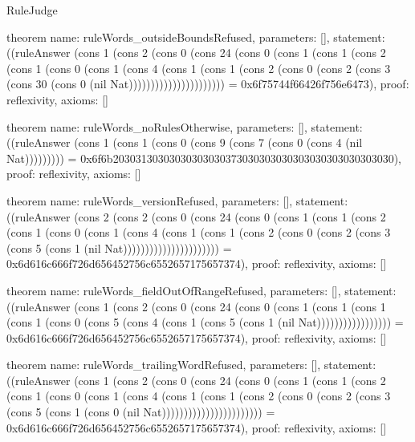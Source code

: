 \begin{lexlean}{RuleJudge}
\begin{semanticmodule}
theorem{
  name: ruleWords_outsideBoundsRefused,
  parameters: [],
  statement: ((ruleAnswer (cons 1 (cons 2 (cons 0 (cons 24 (cons 0 (cons 1 (cons 1 (cons 2 (cons 1 (cons 0 (cons 1 (cons 4 (cons 1 (cons 1 (cons 2 (cons 0 (cons 2 (cons 3 (cons 30 (cons 0 (nil Nat)))))))))))))))))))))) = 0x6f75744f66426f756e6473),
  proof: reflexivity{},
  axioms: []
}

theorem{
  name: ruleWords_noRulesOtherwise,
  parameters: [],
  statement: ((ruleAnswer (cons 1 (cons 1 (cons 0 (cons 9 (cons 7 (cons 0 (cons 4 (nil Nat))))))))) = 0x6f6b20303130303030303030373030303030303030303030303030),
  proof: reflexivity{},
  axioms: []
}

theorem{
  name: ruleWords_versionRefused,
  parameters: [],
  statement: ((ruleAnswer (cons 2 (cons 2 (cons 0 (cons 24 (cons 0 (cons 1 (cons 1 (cons 2 (cons 1 (cons 0 (cons 1 (cons 4 (cons 1 (cons 1 (cons 2 (cons 0 (cons 2 (cons 3 (cons 5 (cons 1 (nil Nat)))))))))))))))))))))) = 0x6d616c666f726d656452756c6552657175657374),
  proof: reflexivity{},
  axioms: []
}

theorem{
  name: ruleWords_fieldOutOfRangeRefused,
  parameters: [],
  statement: ((ruleAnswer (cons 1 (cons 2 (cons 0 (cons 24 (cons 0 (cons 1 (cons 1 (cons 1 (cons 1 (cons 0 (cons 5 (cons 4 (cons 1 (cons 5 (cons 1 (nil Nat))))))))))))))))) = 0x6d616c666f726d656452756c6552657175657374),
  proof: reflexivity{},
  axioms: []
}

theorem{
  name: ruleWords_trailingWordRefused,
  parameters: [],
  statement: ((ruleAnswer (cons 1 (cons 2 (cons 0 (cons 24 (cons 0 (cons 1 (cons 1 (cons 2 (cons 1 (cons 0 (cons 1 (cons 4 (cons 1 (cons 1 (cons 2 (cons 0 (cons 2 (cons 3 (cons 5 (cons 1 (cons 0 (nil Nat))))))))))))))))))))))) = 0x6d616c666f726d656452756c6552657175657374),
  proof: reflexivity{},
  axioms: []
}
\end{semanticmodule}
\end{lexlean}
